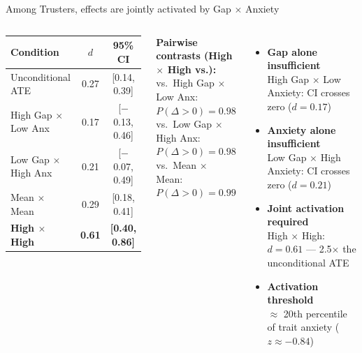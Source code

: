 \documentclass[aspectratio=169,11pt]{beamer}
\begin{document}
\begin{frame}{Among Trusters, effects are jointly activated by Gap $\times$ Anxiety}

\begin{columns}[T]
\begin{table}
\centering
\small
\begin{tabular}{lcc}
\toprule
\textbf{Condition} & \textbf{$d$} & \textbf{95\% CI} \\
\midrule
Unconditional ATE & 0.27 & [0.14, 0.39] \\
\midrule
High Gap $\times$ Low Anx  & 0.17 & [$-$0.13, 0.46] \\
Low Gap $\times$ High Anx  & 0.21 & [$-$0.07, 0.49] \\
Mean $\times$ Mean          & 0.29 & [0.18, 0.41] \\
\textcolor{sbugreen}{\textbf{High $\times$ High}} & \textcolor{sbugreen}{\textbf{0.61}} & \textcolor{sbugreen}{\textbf{[0.40, 0.86]}} \\
\bottomrule
\end{tabular}
\end{table}

\vspace{0.2cm}
{\footnotesize \textcolor{sbugreen}{\textbf{Pairwise contrasts (High $\times$ High vs.):}} \\
vs.\ High Gap $\times$ Low Anx: $P(\Delta > 0) = 0.98$ \\
vs.\ Low Gap $\times$ High Anx: $P(\Delta > 0) = 0.98$ \\
vs.\ Mean $\times$ Mean: $P(\Delta > 0) = 0.99$}

\begin{itemize}
    \item \textbf{Gap alone insufficient} \\
    {\small High Gap $\times$ Low Anxiety: CI crosses zero ($d = 0.17$)}
    \item \textbf{Anxiety alone insufficient} \\
    {\small Low Gap $\times$ High Anxiety: CI crosses zero ($d = 0.21$)}
    \item \textbf{Joint activation required} \\
    {\small High $\times$ High: $d = 0.61$ --- 2.5$\times$ the unconditional ATE}
    \item \textbf{Activation threshold} \\
    {\small $\approx$ 20th percentile of trait anxiety ($z \approx -0.84$)}
\end{itemize}
\end{columns}

\end{frame}
\end{document}

